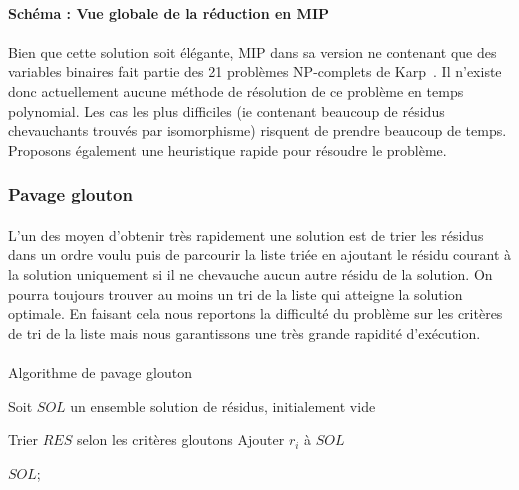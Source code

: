 \documentclass[12pt,french,twoside]{report}
\begin{document}
\paragraph{Schéma : Vue globale de la réduction en MIP}

\paragraph{}Bien que cette solution soit élégante, MIP dans sa version ne contenant que des variables binaires fait partie des 21 problèmes NP-complets de Karp~\cite{karp_reducibility_1972}.
Il n'existe donc actuellement aucune méthode de résolution de ce problème en temps polynomial.
Les cas les plus difficiles (ie contenant beaucoup de résidus chevauchants trouvés par isomorphisme) risquent de prendre beaucoup de temps.
Proposons également une heuristique rapide pour résoudre le problème.



\subsubsection{Pavage glouton}

\label{TM_p}

\paragraph{}L'un des moyen d'obtenir très rapidement une solution est de trier les résidus dans un ordre voulu puis de parcourir la liste triée en ajoutant le résidu courant à la solution uniquement si il ne chevauche aucun autre résidu de la solution.
On pourra toujours trouver au moins un tri de la liste qui atteigne la solution optimale.
En faisant cela nous reportons la difficulté du problème sur les critères de tri de la liste mais nous garantissons une très grande rapidité d'exécution.

\paragraph{}
\begin{algorithm}[H]
  \caption{Algorithme de pavage glouton}
  Soit $SOL$ un ensemble solution de résidus, initialement vide\;
  
  Trier $RES$ selon les critères gloutons\;
   {
     {
      Ajouter $r_i$ à $SOL$\;
    }
  }
  
  \KwRet $SOL$;
\end{algorithm}
\end{document}
